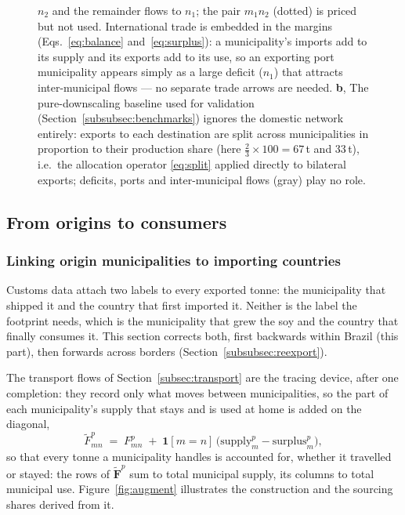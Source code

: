 \documentclass[pdflatex,sn-nature]{sn-jnl}%
\begin{document}
\begin{figure}[htbp]
{$n_2$ and the remainder flows to $n_1$; the pair $m_1n_2$ (dotted) is priced
but not used. International trade is embedded in
the margins (Eqs.~\ref{eq:balance} and~\ref{eq:surplus}): a municipality's
imports add to its supply and its exports add to its use, so an exporting
port municipality appears simply as a large deficit ($n_1$) that attracts
inter-municipal flows --- no separate trade arrows are needed.
\textbf{b}, The pure-downscaling
baseline used for validation (Section~\ref{subsubsec:benchmarks}) ignores
the domestic network entirely: exports to each destination are split across
municipalities in proportion to their production share (here
$\tfrac{2}{3}\times100=67$\,t and $33$\,t), i.e.\ the allocation
operator \eqref{eq:split} applied directly to bilateral exports; deficits,
ports and inter-municipal flows (gray) play no role.}\label{fig:transport}
\end{figure}


\subsection{From origins to consumers}\label{subsec:origin2consumer}

\subsubsection{Linking origin municipalities to importing countries}\label{subsubsec:exportlink}
Customs data attach two labels to every exported tonne: the municipality
that shipped it and the country that first imported it. Neither is the label
the footprint needs, which is the municipality that grew the soy and the
country that finally consumes it. This section corrects both, first
backwards within Brazil (this part), then forwards across borders
(Section~\ref{subsubsec:reexport}).

The transport flows of Section~\ref{subsec:transport} are the tracing
device, after one completion: they record only what moves between
municipalities, so the part of each municipality's supply that stays and is
used at home is added on the diagonal,
\begin{equation}\label{eq:augment}
  \tilde F^p_{mn} \;=\; F^p_{mn} \;+\;
  \mathbf{1}[m=n]\,\big(\text{supply}^p_m-\text{surplus}^p_m\big),
\end{equation}
so that every tonne a municipality handles is accounted for, whether it
travelled or stayed: the rows of $\tilde{\mathbf{F}}^p$ sum to total
municipal supply, its columns to total municipal use.
Figure~\ref{fig:augment} illustrates the construction and the sourcing
shares derived from it.
\end{document}

